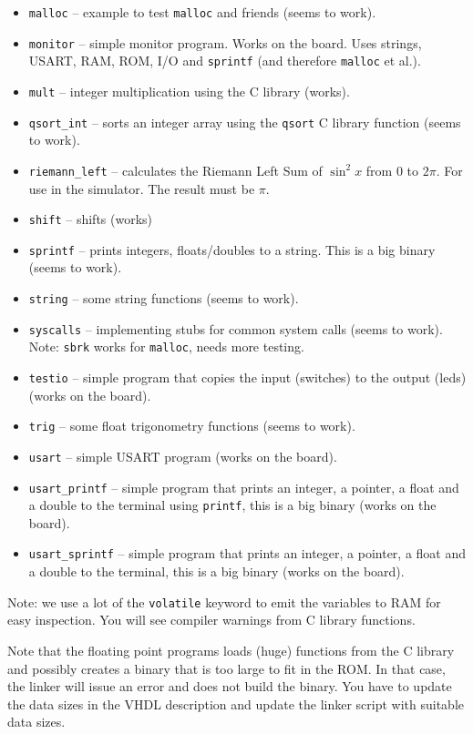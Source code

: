 \documentclass[12pt]{article}
\begin{document}
\begin{itemize}
\item \texttt{malloc} -- example to test \texttt{malloc} and friends (seems to work).
\item \texttt{monitor} -- simple monitor program. Works on the board. Uses strings, USART, RAM, ROM, I/O and \texttt{sprintf} (and therefore \texttt{malloc} et al.).
\item \texttt{mult} -- integer multiplication using the C library (works).
\item \texttt{qsort\_int} -- sorts an integer array using the \texttt{qsort} C library function (seems to work).
\item \texttt{riemann\_left} -- calculates the Riemann Left Sum of $\sin^2 x$ from $0$ to $2\pi$. For use in the simulator. The  result must be $\pi$.
\item \texttt{shift} -- shifts (works)
\item \texttt{sprintf} -- prints integers, floats/doubles to a string. This is a big binary (seems to work).
\item \texttt{string} -- some string functions (seems to work).
\item \texttt{syscalls} -- implementing stubs for common system calls (seems to work). Note: \texttt{sbrk} works for \texttt{malloc}, needs more testing.
\item \texttt{testio} -- simple program that copies the input (switches) to the output (leds) (works on the board).
\item \texttt{trig} -- some float trigonometry functions (seems to work).
\item \texttt{usart} -- simple USART program (works on the board).
\item \texttt{usart\_printf} -- simple program that prints an integer, a pointer, a float and a double to the terminal using \texttt{printf}, this is a big binary (works on the board).
\item \texttt{usart\_sprintf} -- simple program that prints an integer, a pointer, a float and a double to the terminal, this is a big binary (works on the board).
\end{itemize} 

Note: we use a lot of the \texttt{volatile} keyword to emit the variables to RAM for easy inspection. You will see compiler warnings from C library functions.

Note that the floating point programs loads (huge) functions from the C library and possibly creates a binary that is too large to fit in the ROM. In that case, the linker will issue an error and does not build the binary. You have to update the data sizes in the VHDL description and update the linker script with suitable data sizes.
\end{document}
